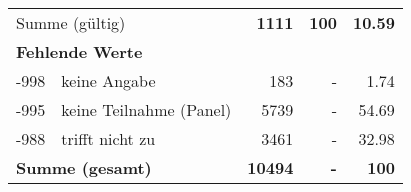 \begin{longtable}{lXrrr}
     \midrule
     \multicolumn{2}{l}{Summe (gültig)} &
       \textbf{\num{1111}} &
     \textbf{100} &
       \textbf{\num[round-mode=places,round-precision=2]{10,59}} \\
     \multicolumn{5}{l}{\textbf{Fehlende Werte}}\\
       -998 &
       keine Angabe &
         \num{183} &
        - &
         \num[round-mode=places,round-precision=2]{1,74} \\
       -995 &
       keine Teilnahme (Panel) &
         \num{5739} &
        - &
         \num[round-mode=places,round-precision=2]{54,69} \\
       -988 &
       trifft nicht zu &
         \num{3461} &
        - &
         \num[round-mode=places,round-precision=2]{32,98} \\
     \midrule
     \multicolumn{2}{l}{\textbf{Summe (gesamt)}} &
          \textbf{\num{10494}} &
        \textbf{-} &
        \textbf{100} \\
     \bottomrule
     \end{longtable}
     
